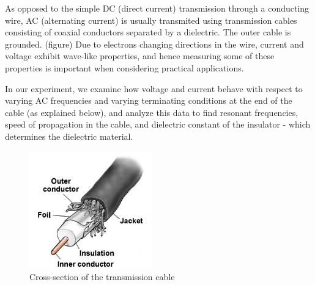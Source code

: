 \documentclass[main.tex]{subfiles}
\begin{document}
As opposed to the simple DC (direct current) transmission through a conducting wire, AC (alternating current) is usually transmited using transmission cables consisting of coaxial conductors separated by a dielectric. The outer cable is grounded. (figure) Due to electrons changing directions in the wire, current and voltage exhibit wave-like properties, and hence measuring some of these properties is important when considering practical applications. 

In our experiment, we examine how voltage and current behave with respect to varying AC frequencies and varying terminating conditions at the end of the cable (as explained below), and analyze this data to find resonant frequencies, speed of propagation in the cable, and dielectric constant of the insulator - which determines the dielectric material. 

\begin{figure}[H]
\includegraphics{../data/cable-coaxial.jpg}
\caption{Cross-section of the transmission cable}
\label{cross-cable}
\end{figure}
\end{document}

